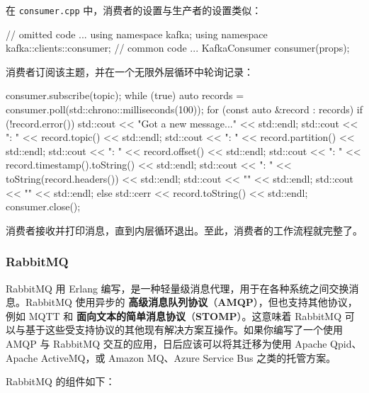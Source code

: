 在 \texttt{consumer.\allowbreak{}cpp} 中，消费者的设置与生产者的设置类似：

\begin{codebox}[text]
// omitted code
...
using namespace kafka;
using namespace kafka::clients::consumer;
// common code
...
KafkaConsumer consumer(props);
\end{codebox}

消费者订阅该主题，并在一个无限外层循环中轮询记录：

\begin{codebox}[cpp]
consumer.subscribe({topic});
while (true) {
  auto records = consumer.poll(std::chrono::milliseconds(100));
  for (const auto &record : records) {
    if (!record.error()) {
      std::cout << "Got a new message..." << std::endl;
      std::cout << "\tTopic    : " << record.topic() << std::endl;
      std::cout << "\tPartition: " << record.partition() << std::endl;
      std::cout << "\tOffset   : " << record.offset() << std::endl;
      std::cout << "\tTimestamp: " << record.timestamp().toString()
                << std::endl;
      std::cout << "\tHeaders  : " << toString(record.headers()) 
                << std::endl;
      std::cout << "" 
                << std::endl;
      std::cout << ""
                << std::endl;
    } else {
      std::cerr << record.toString() << std::endl;
    }
  }
}
consumer.close();
\end{codebox}

\label{idx:1547}
\label{idx:1548}
消费者接收并打印消息，直到内层循环退出。至此，消费者的工作流程就完整了。

\subsubsection{RabbitMQ}

\label{idx:1549}
\label{idx:1550}
\label{idx:1551}
\label{idx:1552}
\label{idx:1553}
RabbitMQ 用 Erlang 编写，是一种轻量级消息代理，用于在各种系统之间交换消息。RabbitMQ 使用异步的 \textbf{高级消息队列协议}（\textbf{AMQP}），但也支持其他协议，例如 MQTT 和 \textbf{面向文本的简单消息协议}（\textbf{STOMP}）。这意味着 RabbitMQ 可以与基于这些受支持协议的其他现有解决方案互操作。如果你编写了一个使用 AMQP 与 RabbitMQ 交互的应用，日后应该可以将其迁移为使用 Apache Qpid、Apache ActiveMQ，或 Amazon MQ、Azure Service Bus 之类的托管方案。

\label{idx:1554}
RabbitMQ 的组件如下：

